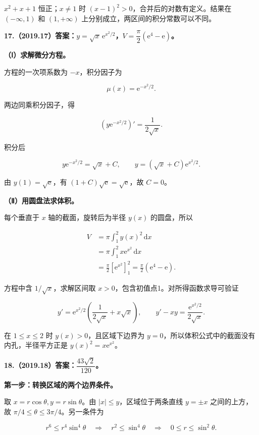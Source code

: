 \documentclass[UTF8,11pt,fontset=windows]{ctexart}
\begin{document}
$x^2+x+1$ 恒正；$x\ne1$ 时 $(x-1)^2>0$，合并后的对数有定义。结果在 $(-\infty,1)$ 和 $(1,+\infty)$ 上分别成立，两区间的积分常数可以不同。

\clearpage

\textbf{17.（2019.17）答案：$y=\sqrt x\,\mathrm e^{x^2/2}$，$V=\dfrac\pi2(\mathrm e^4-\mathrm e)$。}

\textbf{（Ⅰ）求解微分方程。}

方程的一次项系数为 $-x$，积分因子为

$$
\mu(x)=\mathrm e^{-x^2/2}.
$$

两边同乘积分因子，得

$$
\left(y\mathrm e^{-x^2/2}\right)'=\frac1{2\sqrt x}.
$$

积分后

$$
y\mathrm e^{-x^2/2}=\sqrt x+C,
\qquad y=(\sqrt x+C)\mathrm e^{x^2/2}.
$$

由 $y(1)=\sqrt{\mathrm e}$，有 $(1+C)\sqrt{\mathrm e}=\sqrt{\mathrm e}$，故 $C=0$。

\textbf{（Ⅱ）用圆盘法求体积。}

每个垂直于 $x$ 轴的截面，旋转后为半径 $y(x)$ 的圆盘，所以

$$
\begin{aligned}
V&=\pi\int_1^2y(x)^2\,\mathrm dx\\
&=\pi\int_1^2x\mathrm e^{x^2}\,\mathrm dx\\
&=\frac\pi2\left[\mathrm e^{x^2}\right]_1^2
=\frac\pi2(\mathrm e^4-\mathrm e).
\end{aligned}
$$

方程中含 $1/\sqrt x$，求解区间取 $x>0$，包含初值点1。对所得函数求导可验证

$$
y'=\mathrm e^{x^2/2}\left(\frac1{2\sqrt x}+x\sqrt x\right),
\qquad y'-xy=\frac{\mathrm e^{x^2/2}}{2\sqrt x}.
$$

在 $1\le x\le2$ 时 $y(x)>0$，且区域下边界为 $y=0$，所以体积公式中的截面没有内孔，半径平方正是 $y(x)^2=x\mathrm e^{x^2}$。

\clearpage

\textbf{18.（2019.18）答案：$\dfrac{43\sqrt2}{120}$。}

\textbf{第一步：转换区域的两个边界条件。}

取 $x=r\cos\theta,y=r\sin\theta$。由 $|x|\le y$，区域位于两条直线 $y=\pm x$ 之间的上方，故 $\pi/4\le\theta\le3\pi/4$。另一条件为

$$
r^6\le r^4\sin^4\theta
\quad\Longrightarrow\quad r^2\le\sin^4\theta
\quad\Longrightarrow\quad 0\le r\le\sin^2\theta.
$$
\end{document}
